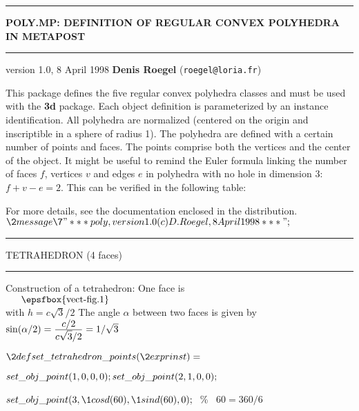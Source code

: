 
\def\9{$\futurelet\next\doit}
\let\[=\relax
\def\doit{\ifx\next\[\def\next{\hfill{\rm\%}}%
     \else\ifx\next\ \def\next{\qquad{\rm\%}}%
     \else\def\next{{\rm\%}}\fi\fi\next}

\def\newpage{\vfill\eject}
\def\vc#1{$\vcenter{#1}$}
\def\title#1{\hrule\vskip1mm#1\par\vskip1mm\hrule\vskip5mm}
\def\figure#1{\par\centerline{\epsfbox{#1}}}
\title{{\bf POLY.MP: DEFINITION OF REGULAR CONVEX POLYHEDRA IN METAPOST}}
\BL
 version 1.0, 8 April 1998
 {\bf Denis Roegel} ({\tt roegel@loria.fr})

This package defines the five regular convex polyhedra classes and
must be used with the {\bf 3d} package.
\BL
Each object definition is parameterized by
an instance identification.
\BL
All polyhedra are normalized (centered on the origin and inscriptible
in a sphere of radius 1).
\BL
The polyhedra are defined with a certain number of points and faces.
The points comprise both the vertices and the center of the object.
\BL
It might be useful to remind the Euler formula linking
the number of faces $f$,
vertices $v$ and edges $e$ in polyhedra with no hole in dimension 3:
$f+v-e=2$. This can be verified in the following table:
\BL
\centerline{\vbox{}}
\BL
For more details, see the documentation enclosed in the distribution.
\BL
$\2{message}\7"*** poly, version 1.0 (c) D. Roegel, 8 April 1998 ***";$\par
\BL
\newpage\title{TETRAHEDRON (4 faces)\kern1cm}
\BL
 Construction of a tetrahedron:
\BL
 One face is \vc{\epsfbox{vect-fig.1}} with $h=c\sqrt{3}/2$
\BL
 The angle $\alpha$ between two faces is given by
 $\sin(\alpha/2)={\displaystyle c/2\over \displaystyle c\sqrt{3}/2}=1/\sqrt3$
\BL
 \figure{vect-fig.2}
\BL
$\2{def}\\{set\_tetrahedron\_points}(\2{expr}\\{inst})=$\par
\quad\quad$\\{set\_obj\_point}(1,0,0,0);\ \\{set\_obj\_point}(2,1,0,0);$\par
\quad\quad$\\{set\_obj\_point}(3,\1{cosd}(60),\1{sind}(60),0);\ \9 $60=360/6$%
\par
\]
